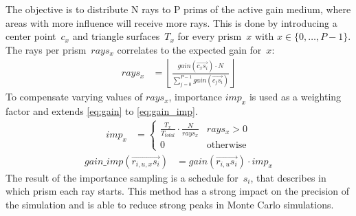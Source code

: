 The objective is to distribute N rays to P prims of the active gain medium, 
where areas with more influence will receive more rays.
This is done by introducing a center point~$c_x$ and triangle surfaces~$T_x$ for
every prism~$x$ with $x \in \{0,\dots,P-1\}$.
The rays per prism~$rays_x$ correlates to the expected gain for~$x$:
\begin{align}
  rays_x       &= \left\lfloor\frac{gain(\overrightarrow{c_xs_i}) \cdot N}{\sum^{P-1}_{j=0} gain(\overrightarrow{c_js_i})}\right\rfloor
\end{align}
To compensate varying values of $rays_x$, importance $imp_x$ is used as a weighting factor
and extends \eqref{eq:gain} to \eqref{eq:gain_imp}.
\begin{align}
imp_x &= 
\begin{cases}
\frac{T_x}{T_{total}} \cdot \frac{N}{rays_x} &rays_x > 0\\
0 &\text{otherwise}
\end{cases}
\end{align}
\begin{align}
\label{eq:gain_imp}
gain\_imp(\overrightarrow{r_{i,u,x}s_i})        &= gain(\overrightarrow{r_{i,u}s_i}) \cdot imp_x
\end{align}
The result of the importance sampling is a schedule for~$s_i$, that
describes in which prism each ray starts.
This method has a strong impact on the precision of the simulation
and is able to reduce strong peaks in Monte Carlo simulations.

